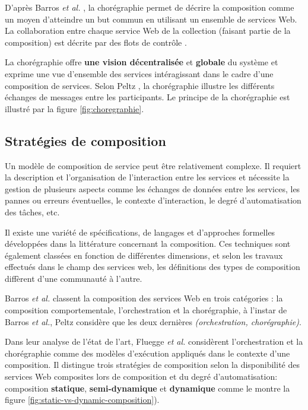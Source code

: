     D'après Barros \emph{et al.} \cite{barros2006standards}, la
    chorégraphie permet de décrire la composition comme un moyen
    d'atteindre un but commun en utilisant un ensemble de services
    Web. La collaboration entre chaque service Web de la collection
    (faisant partie de la composition) est décrite par des flots de
    contrôle \cite{lopez2008selection}.\medskip

    La chorégraphie offre \textbf{une vision décentralisée} et
    \textbf{globale} du système et exprime une vue d'ensemble des
    services intéragissant dans le cadre d'une composition de
    services. Selon Peltz \cite{peltz2003web}, la chorégraphie
    illustre les différents échanges de messages entre les
    participants. Le principe de la chorégraphie est illustré par la
    figure \ref{fig:choregraphie}.

  \subsection{Stratégies de composition}
  \label{sec:types-de-composition}
  Un modèle de composition de service peut être relativement
  complexe. Il requiert la description et l'organisation de
  l'interaction entre les services et nécessite la gestion de
  plusieurs aspects comme les échanges de données entre les services,
  les pannes ou erreurs éventuelles, le contexte d'interaction, le
  degré d'automatisation des tâches, etc. \medskip

  Il existe une variété de spécifications, de langages et
  d'approches formelles développées dans la littérature concernant la
  composition. Ces techniques sont également classées en fonction de
  différentes dimensions, et selon les travaux effectués dans le champ
  des services web, les définitions des types de composition diffèrent
  d'une communauté à l'autre.\medskip

  Barros \emph{et al.} \cite{barros2006standards} classent la
  composition des services Web en trois catégories : la composition
  comportementale, l'orchestration et la chorégraphie, à l'instar de
  Barros \emph{et al.}, Peltz \cite{peltz2003web} considère que les
  deux dernières \textit{(orchestration, chorégraphie)}.\medskip

  

  Dans leur analyse de l'état de l'art,
  Fluegge \emph{et al.}\cite{fluegge2006challenges} considèrent l'orchestration et
  la chorégraphie comme des modèles d'exécution appliqués dans le
  contexte d'une composition. Il distingue trois stratégies de
  composition selon la disponibilité des services Web composites lors
  de composition et du degré d'automatisation: composition
  \textbf{statique}, \textbf{semi-dynamique} et \textbf{dynamique}
   comme le montre la figure \ref{fig:static-vs-dynamic-composition}).

